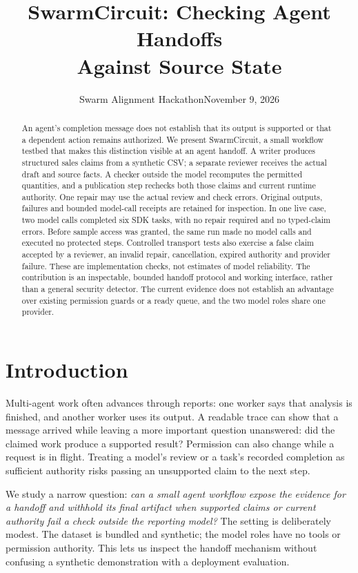 \documentclass[11pt,letterpaper]{article}
\title{\titleface\bfseries\fontsize{20}{23}\selectfont SwarmCircuit: Checking Agent Handoffs\\Against Source State}
\date{Swarm Alignment Hackathon\enspace\textbar\enspace November 9, 2026}
\begin{document}
\maketitle
\vspace{-1em}
\begin{abstract}
An agent's completion message does not establish that its output is supported or that a dependent action remains authorized. We present SwarmCircuit, a small workflow testbed that makes this distinction visible at an agent handoff. A writer produces structured sales claims from a synthetic CSV; a separate reviewer receives the actual draft and source facts. A checker outside the model recomputes the permitted quantities, and a publication step rechecks both those claims and current runtime authority. One repair may use the actual review and check errors. Original outputs, failures and bounded model-call receipts are retained for inspection. In one live case, two model calls completed six SDK tasks, with no repair required and no typed-claim errors. Before sample access was granted, the same run made no model calls and executed no protected steps. Controlled transport tests also exercise a false claim accepted by a reviewer, an invalid repair, cancellation, expired authority and provider failure. These are implementation checks, not estimates of model reliability. The contribution is an inspectable, bounded handoff protocol and working interface, rather than a general security detector. The current evidence does not establish an advantage over existing permission guards or a ready queue, and the two model roles share one provider.
\end{abstract}

\section{Introduction}
Multi-agent work often advances through reports: one worker says that analysis is finished, and another worker uses its output. A readable trace can show that a message arrived while leaving a more important question unanswered: did the claimed work produce a supported result? Permission can also change while a request is in flight. Treating a model's review or a task's recorded completion as sufficient authority risks passing an unsupported claim to the next step.

We study a narrow question: \textit{can a small agent workflow expose the evidence for a handoff and withhold its final artifact when supported claims or current authority fail a check outside the reporting model?} The setting is deliberately modest. The dataset is bundled and synthetic; the model roles have no tools or permission authority. This lets us inspect the handoff mechanism without confusing a synthetic demonstration with a deployment evaluation.
\end{document}
